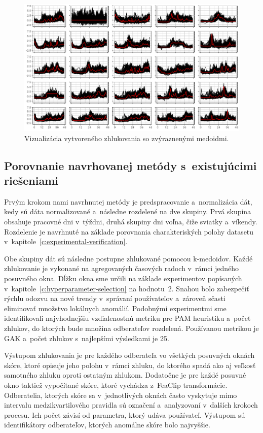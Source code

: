 \documentclass[a4paper,twoside,slovak,12pt,appendix]{article}
\begin{document}
\begin{figure}[htbp]
  \centering
  \includegraphics[width=\textwidth]{clustering_workdays.png}
  \caption{Vizualizácia vytvoreného zhlukovania so zvýraznenými medoidmi.}
	\label{fig:clustering-workdays}
\end{figure}

\subsection{Porovnanie navrhovanej metódy s~existujúcimi riešeniami}
Prvým krokom nami navrhnutej metódy je predspracovanie a~normalizácia dát, kedy
sú dáta normalizované a~následne rozdelené na dve skupiny. Prvá skupina obsahuje
pracovné dni v~týždni, druhá skupiny dni voľna, čiže sviatky a~víkendy.
Rozdelenie je navrhnuté na základe porovnania charakteriských polohy datasetu
v~kapitole~\ref{c:experimental-verification}.

Obe skupiny dát sú následne postupne zhlukované pomocou k-medoidov. Každé
zhlukovanie je vykonané na agregovaných časových radoch v~rámci jedného
posuvného okna. Dĺžku okna sme určili na základe experimentov popísaných
v~kapitole~\ref{c:hyperparameter-selection} na hodnotu~2. Snahou bolo zabezpečiť
rýchlu odozvu na nové trendy v~správaní používateľov a~zároveň sčasti eliminovať
množstvo lokálnych anomálií. Podobnými experimentmi sme identifikovali
najvhodnejšiu vzdialenostnú metriku pre PAM heuristiku a~počet zhlukov, do
ktorých bude množina odberateľov rozdelená. Používanou metrikou je GAK a~počet
zhlukov s~najlepšími výsledkami je 25.

Výstupom zhlukovania je pre každého odberateľa vo všetkých posuvných oknách
skóre, ktoré opisuje jeho polohu v~rámci zhluku, do ktorého spadá ako aj veľkosť
samotného zhluku oproti ostatným zhlukom. Dodatočne je pre každé posuvné okno
taktiež vypočítané skóre, ktoré vychádza z~FeaClip transformácie. Odberatelia,
ktorých skóre sa v~jednotlivých oknách často vyskytuje mimo intervalu
medzikvartilového pravidla sú označení a~analyzovaní v~ďalších krokoch procesu.
Ich počet závisí od parametra, ktorý udáva používateľ. Výstupom sú
identifikátory odberateľov, ktorých anomálne skóre bolo najvyššie.
\end{document}
